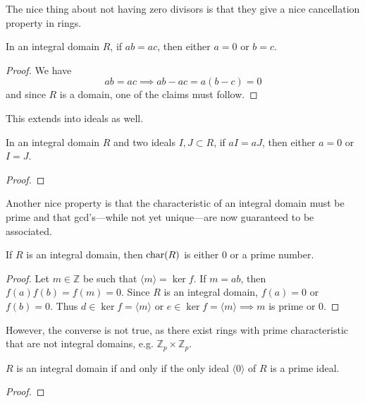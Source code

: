   The nice thing about not having zero divisors is that they give a nice cancellation property in rings. 

  \begin{lemma}
    In an integral domain $R$, if $ab = ac$, then either $a = 0$ or $b = c$. 
  \end{lemma}
  \begin{proof}
    We have 
    \begin{equation}
      ab = ac \implies ab - ac = a(b - c) = 0
    \end{equation}
    and since $R$ is a domain, one of the claims must follow. 
  \end{proof}

  This extends into ideals as well. 

  \begin{theorem}
    In an integral domain $R$ and two ideals $I, J \subset R$, if $aI = aJ$, then either $a = 0$ or $I = J$. 
  \end{theorem}
  \begin{proof}
    
  \end{proof}

  Another nice property is that the characteristic of an integral domain must be prime and that gcd's---while not yet unique---are now guaranteed to be associated. 

  \begin{corollary}
    If $R$ is an integral domain, then $\operatorname{char}(R)$ is either $0$ or a prime number. 
  \end{corollary}
  \begin{proof}
    Let $m \in \mathbb{Z}$ be such that $\langle m \rangle = \ker{f}$. If $m = ab$, then $f(a) f(b) = f(m) = 0$. Since $R$ is an integral domain, $f(a) = 0$ or $f(b) = 0$. Thus $d \in \ker{f} = \langle m \rangle$ or $e \in \ker{f} = \langle m \rangle \implies m$ is prime or $0$. 
  \end{proof}

  However, the converse is not true, as there exist rings with prime characteristic that are not integral domains, e.g. $\mathbb{Z}_p \times \mathbb{Z}_p$. 

  \begin{theorem}
    $R$ is an integral domain if and only if the only ideal $\langle 0 \rangle$ of $R$ is a prime ideal. 
  \end{theorem}
  \begin{proof}
    
  \end{proof}

